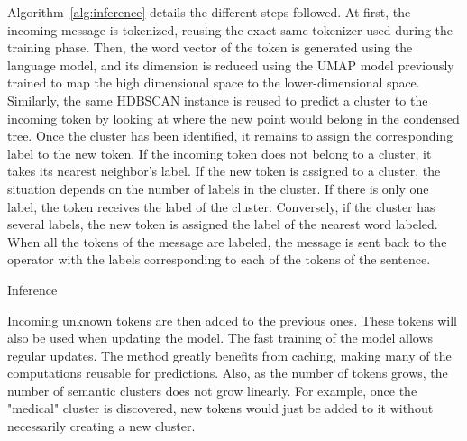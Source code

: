 Algorithm~\ref{alg:inference} details the different steps followed.
At first, the incoming message is tokenized, reusing the exact same tokenizer used during the training phase.
Then, the word vector of the token is generated using the language model, and its dimension is reduced using the UMAP model previously trained to map the high dimensional space to the lower-dimensional space.
Similarly, the same HDBSCAN instance is reused to predict a cluster to the incoming token by looking at where the new point would belong in the condensed tree.
Once the cluster has been identified, it remains to assign the corresponding label to the new token.
If the incoming token does not belong to a cluster, it takes its nearest neighbor's label.
If the new token is assigned to a cluster, the situation depends on the number of labels in the cluster.
If there is only one label, the token receives the label of the cluster.
Conversely, if the cluster has several labels, the new token is assigned the label of the nearest word labeled.
When all the tokens of the message are labeled, the message is sent back to the operator with the labels corresponding to each of the tokens of the sentence.

\begin{algorithm}[htb]
    \DontPrintSemicolon
    \caption{Inference\label{alg:inference}}
\end{algorithm}

Incoming unknown tokens are then added to the previous ones.
These tokens will also be used when updating the model.
The fast training of the model allows regular updates.
The method greatly benefits from caching, making many of the computations reusable for predictions.
Also, as the number of tokens grows, the number of semantic clusters does not grow linearly.
For example, once the "medical" cluster is discovered, new tokens would just be added to it without necessarily creating a new cluster.

